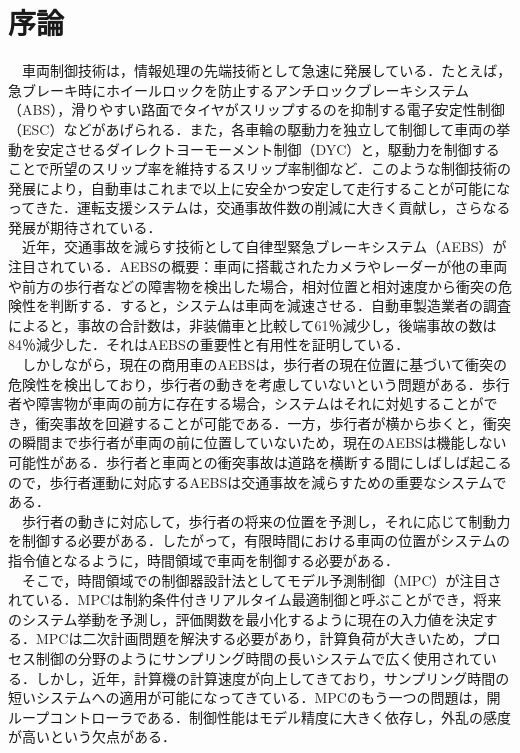 \chapter{序論}
　車両制御技術は，情報処理の先端技術として急速に発展している．たとえば，急ブレーキ時にホイールロックを防止するアンチロックブレーキシステム（ABS），滑りやすい路面でタイヤがスリップするのを抑制する電子安定性制御（ESC）などがあげられる．また，各車輪の駆動力を独立して制御して車両の挙動を安定させるダイレクトヨーモーメント制御（DYC）と，駆動力を制御することで所望のスリップ率を維持するスリップ率制御など．このような制御技術の発展により，自動車はこれまで以上に安全かつ安定して走行することが可能になってきた．運転支援システムは，交通事故件数の削減に大きく貢献し，さらなる発展が期待されている．\cite{harris}\\
　近年，交通事故を減らす技術として自律型緊急ブレーキシステム（AEBS）が注目されている．AEBSの概要：車両に搭載されたカメラやレーダーが他の車両や前方の歩行者などの障害物を検出した場合，相対位置と相対速度から衝突の危険性を判断する．すると，システムは車両を減速させる．自動車製造業者の調査によると\cite{susan}，事故の合計数は，非装備車と比較して61％減少し，後端事故の数は84％減少した．それはAEBSの重要性と有用性を証明している．\\
　しかしながら，現在の商用車のAEBSは，歩行者の現在位置に基づいて衝突の危険性を検出しており，歩行者の動きを考慮していないという問題がある．歩行者や障害物が車両の前方に存在する場合，システムはそれに対処することができ，衝突事故を回避することが可能である．一方，歩行者が横から歩くと，衝突の瞬間まで歩行者が車両の前に位置していないため，現在のAEBSは機能しない可能性がある．歩行者と車両との衝突事故は道路を横断する間にしばしば起こるので，歩行者運動に対応するAEBSは交通事故を減らすための重要なシステムである．\\
　歩行者の動きに対応して，歩行者の将来の位置を予測し，それに応じて制動力を制御する必要がある．したがって，有限時間における車両の位置がシステムの指令値となるように，時間領域で車両を制御する必要がある．\\
　そこで，時間領域での制御器設計法としてモデル予測制御（MPC）が注目されている．MPCは制約条件付きリアルタイム最適制御と呼ぶことができ，将来のシステム挙動を予測し，評価関数を最小化するように現在の入力値を決定する．MPCは二次計画問題を解決する必要があり，計算負荷が大きいため，プロセス制御の分野のようにサンプリング時間の長いシステムで広く使用されている．しかし，近年，計算機の計算速度が向上してきており，サンプリング時間の短いシステムへの適用が可能になってきている．MPCのもう一つの問題は，開ループコントローラである．制御性能はモデル精度に大きく依存し，外乱の感度が高いという欠点がある．\\
